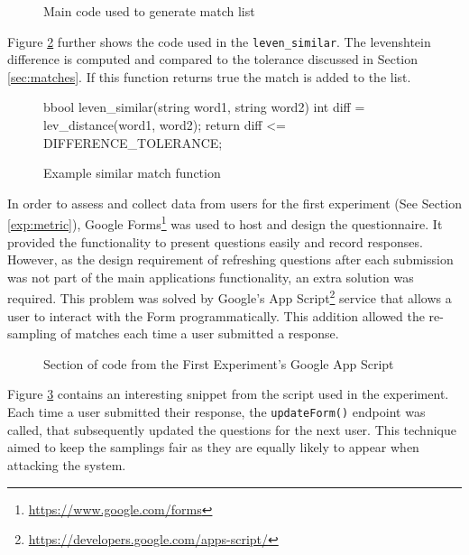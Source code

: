 \begin{figure}[h!]
  \centering
  
  \caption{Main code used to generate match list}
  \label{fig:trustwordMatch}
\end{figure}

Figure \ref{fig:matchExample} further shows the code used in the \verb|leven_similar|. The levenshtein difference is computed and compared to the tolerance discussed in Section \ref{sec:matches}. If this function returns true the match is added to the list.

\begin{figure}[h!]
\begin{Code}[CppStyle]
bbool leven_similar(string word1, string word2)
{
  int diff = lev_distance(word1, word2);
  return diff <= DIFFERENCE_TOLERANCE;
}
\end{Code}
\caption{Example similar match function}
\label{fig:matchExample}
\end{figure}

\newpage

In order to assess and collect data from users for the first experiment (See Section \ref{exp:metric}), Google Forms\footnote{\url{https://www.google.com/forms}} was used to host and design the questionnaire. It provided the functionality to present questions easily and record responses. However, as the design requirement of refreshing questions after each submission was not part of the main applications functionality, an extra solution was required. This problem was solved by Google's App Script\footnote{\url{https://developers.google.com/apps-script/}} service that allows a user to interact with the Form programmatically. This addition allowed the re-sampling of matches  each time a user submitted a response. 

\begin{figure}[!h]
  \centering
  
\caption{Section of code from the First Experiment's Google App Script}
\label{fig:GoogleAppScript}
\end{figure}

Figure \ref{fig:GoogleAppScript} contains an interesting snippet from the script used in the experiment. Each time a user submitted their response, the \verb|updateForm()| endpoint was called, that subsequently updated the questions for the next user. This technique aimed to keep the samplings fair as they are equally likely to appear when attacking the system.

\newpage

